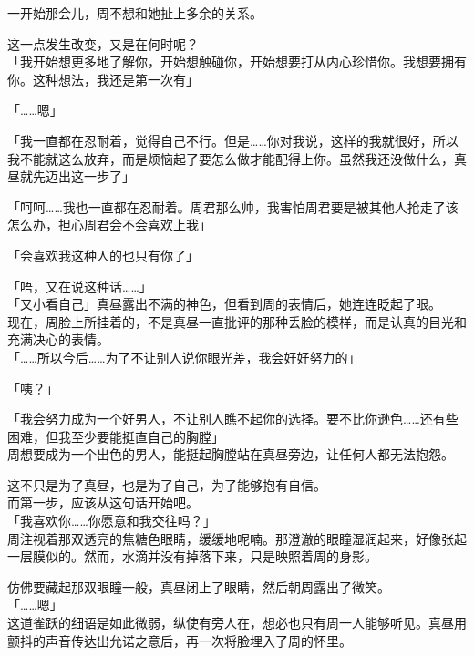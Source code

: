 一开始那会儿，周不想和她扯上多余的关系。

这一点发生改变，又是在何时呢？\\

「我开始想更多地了解你，开始想触碰你，开始想要打从内心珍惜你。我想要拥有你。这种想法，我还是第一次有」

「……嗯」

「我一直都在忍耐着，觉得自己不行。但是……你对我说，这样的我就很好，所以我不能就这么放弃，而是烦恼起了要怎么做才能配得上你。虽然我还没做什么，真昼就先迈出这一步了」

「呵呵……我也一直都在忍耐着。周君那么帅，我害怕周君要是被其他人抢走了该怎么办，担心周君会不会喜欢上我」

「会喜欢我这种人的也只有你了」

「唔，又在说这种话……」\\

「又小看自己」真昼露出不满的神色，但看到周的表情后，她连连眨起了眼。\\

现在，周脸上所挂着的，不是真昼一直批评的那种丢脸的模样，而是认真的目光和充满决心的表情。\\

「……所以今后……为了不让别人说你眼光差，我会好好努力的」

「咦？」

「我会努力成为一个好男人，不让别人瞧不起你的选择。要不比你逊色……还有些困难，但我至少要能挺直自己的胸膛」\\

周想要成为一个出色的男人，能挺起胸膛站在真昼旁边，让任何人都无法抱怨。

这不只是为了真昼，也是为了自己，为了能够抱有自信。\\

而第一步，应该从这句话开始吧。\\

「我喜欢你……你愿意和我交往吗？」\\

周注视着那双透亮的焦糖色眼睛，缓缓地呢喃。那澄澈的眼瞳湿润起来，好像张起一层膜似的。然而，水滴并没有掉落下来，只是映照着周的身影。

仿佛要藏起那双眼瞳一般，真昼闭上了眼睛，然后朝周露出了微笑。\\

「……嗯」\\

这道雀跃的细语是如此微弱，纵使有旁人在，想必也只有周一人能够听见。真昼用颤抖的声音传达出允诺之意后，再一次将脸埋入了周的怀里。

